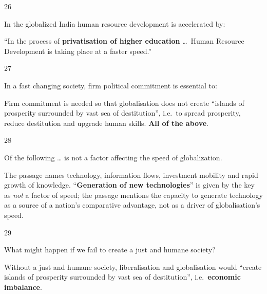 \begin{question}{26}
{In the globalized India human resource development is accelerated by:\par}
\begin{explain}
``In the process of \textbf{privatisation of higher education} \ldots\ Human Resource Development is taking place at a faster speed.''
\end{explain}
\end{question}

\begin{question}{27}
{In a fast changing society, firm political commitment is essential to:\par}
\begin{explain}
Firm commitment is needed so that globalisation does not create ``islands of prosperity surrounded by vast sea of destitution'', i.e.\ to spread prosperity, reduce destitution and upgrade human skills. \textbf{All of the above}.
\end{explain}
\end{question}

\begin{question}{28}
{Of the following \ldots{} is not a factor affecting the speed of globalization.\par}
\begin{explain}
The passage names technology, information flows, investment mobility and rapid growth of knowledge. ``\textbf{Generation of new technologies}'' is given by the key as \emph{not} a factor of speed; the passage mentions the capacity to generate technology as a source of a nation's comparative advantage, not as a driver of globalisation's speed.
\end{explain}
\end{question}

\begin{question}{29}
{What might happen if we fail to create a just and humane society?\par}
\begin{explain}
Without a just and humane society, liberalisation and globalisation would ``create islands of prosperity surrounded by vast sea of destitution'', i.e.\ \textbf{economic imbalance}.
\end{explain}
\end{question}

